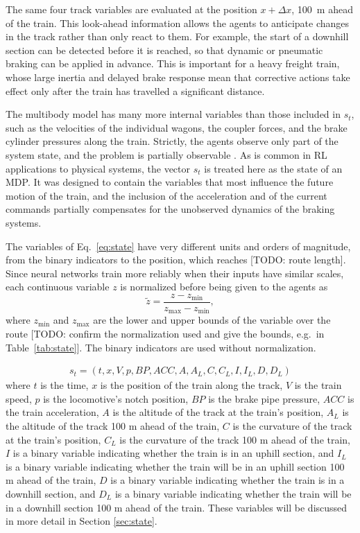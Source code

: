 \documentclass[preprint,10pt]{elsarticle}
\begin{document}
The same four track variables are evaluated at the position $x + \Delta x$, 100~m ahead of the train. This look-ahead information allows the agents to anticipate changes in the track rather than only react to them. For example, the start of a downhill section can be detected before it is reached, so that dynamic or pneumatic braking can be applied in advance. This is important for a heavy freight train, whose large inertia and delayed brake response mean that corrective actions take effect only after the train has travelled a significant distance.

The multibody model has many more internal variables than those included in $s_t$, such as the velocities of the individual wagons, the coupler forces, and the brake cylinder pressures along the train. Strictly, the agents observe only part of the system state, and the problem is partially observable \citep{kaelbling1998planning}. As is common in RL applications to physical systems, the vector $s_t$ is treated here as the state of an MDP. It was designed to contain the variables that most influence the future motion of the train, and the inclusion of the acceleration and of the current commands partially compensates for the unobserved dynamics of the braking systems.

The variables of Eq.~\eqref{eq:state} have very different units and orders of magnitude, from the binary indicators to the position, which reaches [TODO: route length]. Since neural networks train more reliably when their inputs have similar scales, each continuous variable $z$ is normalized before being given to the agents as
\begin{equation}
    \tilde{z} = \frac{z - z_{\min}}{z_{\max} - z_{\min}},
    \label{eq:normalization}
\end{equation}
where $z_{\min}$ and $z_{\max}$ are the lower and upper bounds of the variable over the route [TODO: confirm the normalization used and give the bounds, e.g.\ in Table~\ref{tab:state}]. The binary indicators are used without normalization.

\begin{align}
    s_t = (t, x, V, p, BP, ACC, A, A_L, C, C_L, I, I_L, D, D_L)
\end{align}
where $t$ is the time, $x$ is the position of the train along the track, $V$ is the train speed, $p$ is the locomotive's notch position, $BP$ is the brake pipe pressure, $ACC$ is the train acceleration, $A$ is the altitude of the track at the train's position, $A_L$ is the altitude of the track 100 m ahead of the train, $C$ is the curvature of the track at the train's position, $C_L$ is the curvature of the track 100 m ahead of the train, $I$ is a binary variable indicating whether the train is in an uphill section, and $I_L$ is a binary variable indicating whether the train will be in an uphill section 100 m ahead of the train, $D$ is a binary variable indicating whether the train is in a downhill section, and $D_L$ is a binary variable indicating whether the train will be in a downhill section 100 m ahead of the train. These variables will be discussed in more detail in Section \ref{sec:state}. 
\end{document}
